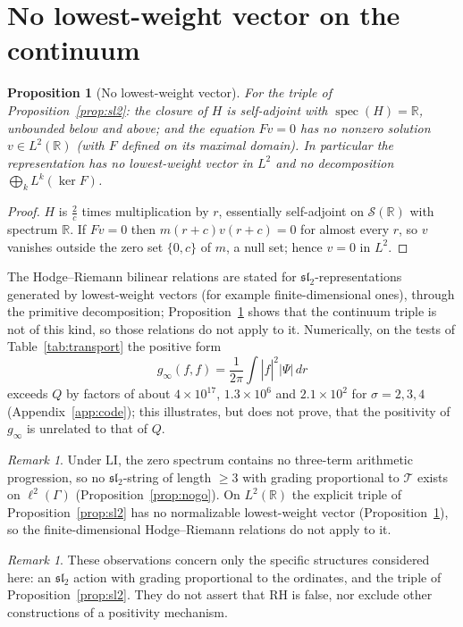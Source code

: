 \documentclass[11pt]{amsart}
\newtheorem{proposition}[theorem]{Proposition}
\theoremstyle{definition}
\theoremstyle{remark}
\newtheorem{remark}[theorem]{Remark}
\newcommand{\RH}{\mathrm{RH}}
\newcommand{\T}{\mathcal T}
\newcommand{\sltwo}{\mathfrak{sl}_2}
\DeclareMathOperator{\spec}{spec}
\begin{document}
\section{No lowest-weight vector on the continuum}\label{sec:dichotomy}

\begin{proposition}[No lowest-weight vector]\label{prop:ps}
For the triple of Proposition~\ref{prop:sl2}: the closure of $H$ is
self-adjoint with $\spec(H)=\mathbb R$, unbounded below and above; and the
equation $Fv=0$ has no nonzero solution $v\in L^2(\mathbb R)$ (with $F$ defined
on its maximal domain). In particular the representation has no lowest-weight
vector in $L^2$ and no decomposition $\bigoplus_kL^k(\ker F)$.
\end{proposition}

\begin{proof}
$H$ is $\frac2c$ times multiplication by $r$, essentially self-adjoint on
$\mathcal S(\mathbb R)$ with spectrum $\mathbb R$. If $Fv=0$ then
$m(r+c)v(r+c)=0$ for almost every $r$, so $v$ vanishes outside the zero set
$\{0,c\}$ of $m$, a null set; hence $v=0$ in $L^2$.
\end{proof}

The Hodge--Riemann bilinear relations are stated for $\sltwo$-representations
generated by lowest-weight vectors (for example finite-dimensional ones), through
the primitive decomposition; Proposition~\ref{prop:ps} shows that the continuum triple is not
of this kind, so those relations do not apply to it. Numerically, on the tests
of Table~\ref{tab:transport} the positive form
\[g_\infty(f,f)=\frac1{2\pi}\int|\widehat f|^2|\Psi|\,dr\]
exceeds $Q$ by factors of
about $4\times10^{17}$, $1.3\times10^{6}$ and $2.1\times10^{2}$ for $\sigma=2,3,4$
(Appendix~\ref{app:code}); this illustrates, but does not prove, that the
positivity of $g_\infty$ is unrelated to that of $Q$.

\begin{remark}\label{thm:dichotomy}
Under $\mathrm{LI}$, the zero spectrum contains no three-term arithmetic
progression, so no $\sltwo$-string of length $\ge3$ with grading proportional to
$\T$ exists on $\ell^2(\Gamma)$ (Proposition~\ref{prop:nogo}). On
$L^2(\mathbb R)$ the explicit triple of Proposition~\ref{prop:sl2} has no
normalizable lowest-weight vector (Proposition~\ref{prop:ps}), so the
finite-dimensional Hodge--Riemann relations do not apply to it.
\end{remark}

\begin{remark}
These observations concern only the specific structures considered here: an
$\sltwo$ action with grading proportional to the ordinates, and the triple of
Proposition~\ref{prop:sl2}. They do not assert that $\RH$ is false, nor exclude
other constructions of a positivity mechanism.
\end{remark}
\end{document}
